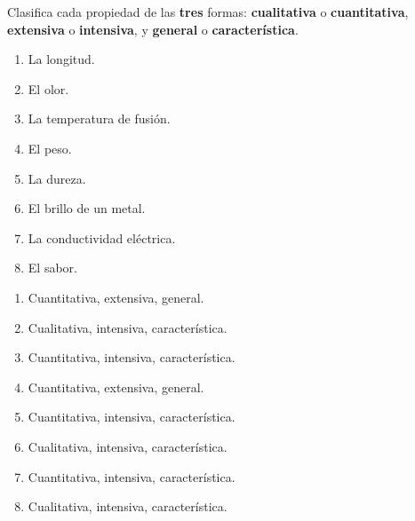 \begin{exercise}
    Clasifica cada propiedad de las \textbf{tres} formas: \textbf{cualitativa} o \textbf{cuantitativa}, \textbf{extensiva} o \textbf{intensiva}, y \textbf{general} o \textbf{característica}.
    \begin{enumerate}[label=\letraminuscula]
        \item La longitud.
        \item El olor.
        \item La temperatura de fusión.
        \item El peso.
        \item La dureza.
        \item El brillo de un metal.
        \item La conductividad eléctrica.
        \item El sabor.
    \end{enumerate}
    \begin{solu}
        \begin{enumerate}[label=\alph*)]
            \item Cuantitativa, extensiva, general.
            \item Cualitativa, intensiva, característica.
            \item Cuantitativa, intensiva, característica.
            \item Cuantitativa, extensiva, general.
            \item Cuantitativa, intensiva, característica.
            \item Cualitativa, intensiva, característica.
            \item Cuantitativa, intensiva, característica.
            \item Cualitativa, intensiva, característica.
        \end{enumerate}
    \end{solu}
\end{exercise}

